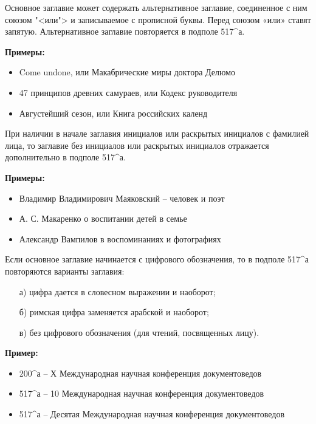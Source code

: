 Основное заглавие может содержать альтернативное заглавие, соединенное с ним союзом "<или"> и записываемое с прописной буквы. Перед союзом «или» ставят запятую. Альтернативное заглавие повторяется в подполе 517\^{}а.

\textbf{Примеры:}

\begin{itemize}
	\item Come undone, или Макабрические миры доктора Делюмо
	\item 47 принципов древних самураев, или Кодекс руководителя
	\item Августейший сезон, или Книга российских календ
\end{itemize}

При наличии в начале заглавия инициалов или раскрытых инициалов с фамилией лица, то заглавие без инициалов или раскрытых инициалов отражается дополнительно в подполе 517\^{}а.

\textbf{Примеры:}

\begin{itemize}
	\item Владимир Владимирович Маяковский -- человек и поэт
	\item А. С. Макаренко о воспитании детей в семье
	\item Александр Вампилов в воспоминаниях и фотографиях
\end{itemize}

Если основное заглавие начинается с цифрового обозначения, то в подполе 517\^{}а повторяются варианты заглавия:

\begin{itemize}
	\item[а)] цифра дается в словесном выражении и наоборот;
	\item[б)] римская цифра заменяется арабской и наоборот;
	\item[в)] без цифрового обозначения (для чтений, посвященных лицу).
\end{itemize}

\textbf{Пример:}

\begin{itemize}
	\item 200\^{}а – Х Международная научная конференция документоведов
	\item 517\^{}а – 10 Международная научная конференция документоведов
	\item 517\^{}а – Десятая Международная научная конференция документоведов
\end{itemize}

